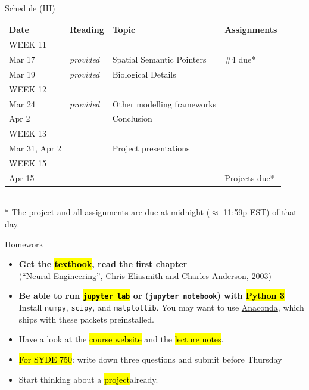\documentclass[aspectratio=169]{beamer}
\begin{document}
\begin{frame}{Schedule (III)}
	\small
	\begin{tabular}{p{2cm} p{2cm} p{5cm} p{3cm}}
		\toprule
		\textbf{Date} &	\textbf{Reading} &	\textbf{Topic} & \textbf{Assignments} \\
		\tiny WEEK 11 & & & \\
		Mar 17 &
		\emph{provided} &
		Spatial Semantic Pointers &
		\#4 due*\\
		Mar 19 &
		\emph{provided} &
		Biological Details &
		\\[0.05cm]
		
		\tiny WEEK 12 & & & \\
		Mar 24 &
		\emph{provided} &
		Other modelling frameworks &
		\\
		Apr 2 &
		&
		Conclusion &
		\\[0.05cm]
		
		\tiny WEEK 13 & & & \\
		Mar 31, Apr 2 &
		&
		Project presentations &
		\\[0.05cm]
		
		\tiny WEEK 15 & & & \\
		Apr 15 &
		&
		&
		Projects due* \\
		\bottomrule
	\end{tabular}\\[0.2cm]
	\footnotesize
	* The project and all assignments are due at midnight ($\approx$ 11:59p EST) of that day.
\end{frame}

\begin{frame}{Homework}
	\begin{itemize}
		\setlength{\itemsep}{0.5cm}
		\item \textbf{Get the \hl{textbook}, read the first chapter}\\
		(\enquote{Neural Engineering}, Chris Eliasmith and Charles Anderson, 2003)
		\item \textbf{Be able to run \hl{\texttt{jupyter lab}} or (\texttt{jupyter notebook}) with \hl{Python 3}}\\
		Install \texttt{numpy}, \texttt{scipy}, and \texttt{matplotlib}. You may want to use \href{https://www.anaconda.com/distribution/}{Anaconda}, which ships with these packets preinstalled.
		\item Have a look at the \hl{course website} and the \hl{lecture notes}.
		\item \hl{For SYDE 750}: write down three questions and submit before Thursday
		\item Start thinking about a \hl{project}\textellipsis already.
	\end{itemize}
\end{frame}
\end{document}

